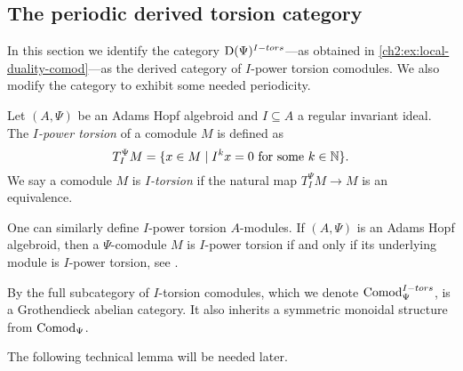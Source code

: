 









\subsection{The periodic derived torsion category}
\label{ch2:ssec:the-algebraic-model}

In this section we identify the category $\mathrm{D}(\Psi)^{I-tors}$---as obtained in \cref{ch2:ex:local-duality-comod}---as the derived category of $I$-power torsion comodules. We also modify the category to exhibit some needed periodicity. 

\begin{definition}
    \label{ch2:def:I-power-torsion-comodule}
    Let $(A,\Psi)$ be an Adams Hopf algebroid and $I\subseteq A$ a regular invariant ideal. The\emph{ $I$-power torsion} of a comodule $M$ is defined as 
    $$T_I^\Psi M = \{x\in M \mid I^kx = 0 \text{ for some } k\in \mathbb{N}\}.$$
    We say a comodule $M$ is \emph{$I$-torsion} if the natural map $T_I^\Psi M\longrightarrow M$ is an equivalence. 
\end{definition}

\begin{remark}
    \label{ch2:rm:torsion-iff-underlying-is-torsion}
    One can similarly define $I$-power torsion $A$-modules. If $(A,\Psi)$ is an Adams Hopf algebroid, then a $\Psi$-comodule $M$ is $I$-power torsion if and only if its underlying module is $I$-power torsion, see \cite[5.7]{barthel-heard-valenzuela_2018}. 
\end{remark}

\begin{remark}
    \label{ch2:rm:torsion-comodules-grothendieck-monoidal}
    By \cite[5.10]{barthel-heard-valenzuela_2018} the full subcategory of $I$-torsion comodules, which we denote $\mathrm{Comod}_\Psi^{I-tors}$, is a Grothendieck abelian category. It also inherits a symmetric monoidal structure from $\mathrm{Comod}_\Psi$. 
\end{remark}

The following technical lemma will be needed later. 

